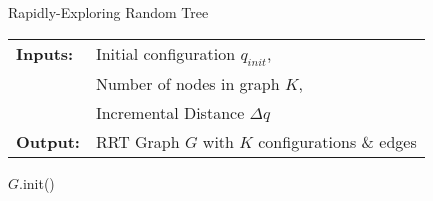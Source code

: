 
\begin{algorithm}[H]
    \caption{Rapidly-Exploring Random Tree}
    \SetAlgoLined
    \begin{tabular}{l l}
    \textbf{Inputs:}    & Initial configuration $q_{init}$,\\ 
                        & Number of nodes in graph $K$, \\
                        & Incremental Distance $\Delta q$ \\
    \textbf{Output:}    & RRT Graph $G$ with $K$ configurations \& edges \\
    \end{tabular}

        $G$.init()\;
\label{algorithm:rrt}
\end{algorithm}